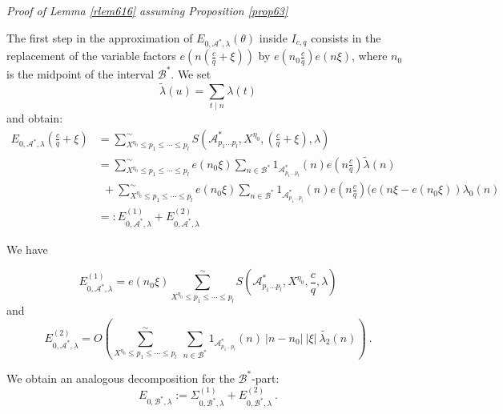 \documentclass{amsart}
\numberwithin{equation}{subsection}
\begin{document}
\noindent\textit{Proof of Lemma \ref{rlem616} assuming Proposition \ref{prop63} }

The first step in the approximation of $E_{0, \mathcal{A}^*, \lambda}(\theta)$ inside $I_{c,q}$ consists in the replacement of the variable factors $e\left( n\left(\frac{c}{q}+\xi\right)\right)$ by $e\left(n_0\frac{c}{q}\right)e(n\xi)$, where $n_0$ is the midpoint of the interval $\mathcal{B}^*$. We set
$$\tilde{\lambda}(u)=\sum_{t\mid n} \lambda (t)$$
and obtain:
\begin{align*}
E_{0, \mathcal{A}^*, \lambda}\left(\frac{c}{q}+\xi\right)& =\sum_{X^{\eta_0}\leq p_1\leq \cdots\leq p_l}^\sim S\left(\mathcal{A}^*_{p_1\ldots p_l}, X^{\eta_0}, \left(\frac{c}{q}+\xi\right), \lambda\right)   \tag{6.23}\\
&=\sum_{X^{\eta_0}\leq p_1\leq \cdots\leq p_l}^\sim e(n_0\xi) \sum_{n\in\mathcal{B}^*}  1_{\mathcal{A}^*_{p_1\ldots p_l}}(n) e\left(n\frac{c}{q}\right) \tilde{\lambda}(n)\\
&\ \ +\sum_{X^{\eta_0}\leq p_1\leq \cdots\leq p_l}^\sim e(n_0\xi) \sum_{n\in\mathcal{B}^*}  1_{\mathcal{A}^*_{p_1\ldots p_l}}(n) e\left(n\frac{c}{q}\right) (e(n\xi-e(n_0\xi))\lambda_0(n)\\
&=:  E_{0, \mathcal{A}^*, \lambda}^{(1)}+ E_{0, \mathcal{A}^*, \lambda}^{(2)}
\end{align*}

We have

\[
E_{0, \mathcal{A}^*, \lambda}^{(1)} = e(n_0\xi)\sum_{X^{\eta_0}\leq p_1\leq \cdots \leq p_l}^\sim  S\left(\mathcal{A}^*_{p_1\ldots p_l}, X^{\eta_0}, \frac{c}{q}, \lambda\right)    \tag{6.24}
\]
and
\[
E_{0, \mathcal{A}^*, \lambda}^{(2)} = O\left(\sum_{X^{\eta_0}\leq p_1\leq \cdots \leq p_l}^\sim \ \sum_{n\in\mathcal{B}^*} 1_{\mathcal{A}^*_{p_1\ldots p_l}}(n)\: |n-n_0|\:|\xi| \:\tilde{\lambda_2}(n)\right) \:.     \tag{6.25}
\]

We obtain an analogous decomposition for the $\mathcal{B}^*$-part:
$$E_{0, \mathcal{B}^*, \lambda}:=\Sigma^{(1)}_{0,\mathcal{B}^*, \lambda }+E_{0, \mathcal{B}^*, \lambda}^{(2)} \:.$$
\end{document}
